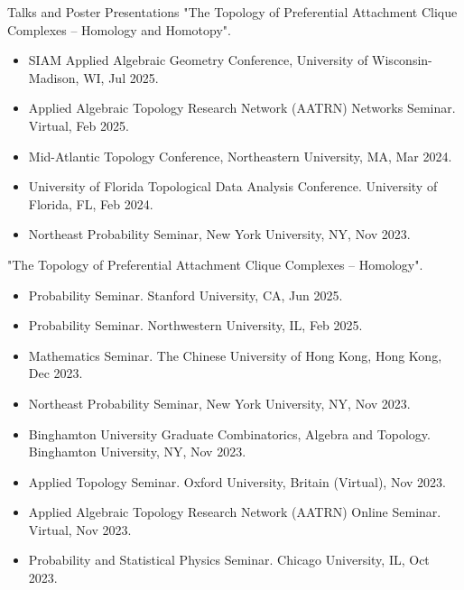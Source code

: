\documentclass{resume} %
\begin{document}
\begin{rSection}{Talks and Poster Presentations}
"The Topology of Preferential Attachment Clique Complexes -- Homology and Homotopy".
\begin{itemize}[noitemsep]
    \item SIAM Applied Algebraic Geometry Conference, University of Wisconsin-Madison, WI, Jul 2025.
    \item[$\ast$] Applied Algebraic Topology Research Network (AATRN) Networks Seminar. Virtual, Feb 2025.
    \item[$\diamond$] Mid-Atlantic Topology Conference, Northeastern University, MA, Mar 2024.
    \item[$\ast$] University of Florida Topological Data Analysis Conference. University of Florida, FL, Feb 2024.
    \item Northeast Probability Seminar, New York University, NY, Nov 2023.
\end{itemize}
"The Topology of Preferential Attachment Clique Complexes -- Homology".
\begin{itemize}[noitemsep]
    \item[$\ast$] Probability Seminar. Stanford University, CA, Jun 2025.
    \item[$\ast$] Probability Seminar. Northwestern University, IL, Feb 2025.
    \item[$\ast$] Mathematics Seminar. The Chinese University of Hong Kong, Hong Kong, Dec 2023.
    \item Northeast Probability Seminar, New York University, NY, Nov 2023.
    \item Binghamton University Graduate Combinatorics, Algebra and Topology. Binghamton University, NY, Nov 2023.
    \item[$\ast$] Applied Topology Seminar. Oxford University, Britain (Virtual), Nov 2023.
    \item[$\ast$] Applied Algebraic Topology Research Network (AATRN) Online Seminar. Virtual, Nov 2023.
    \item[$\ast$] Probability and Statistical Physics Seminar. Chicago University, IL, Oct 2023.

\end{itemize}
\end{rSection}
\end{document}

